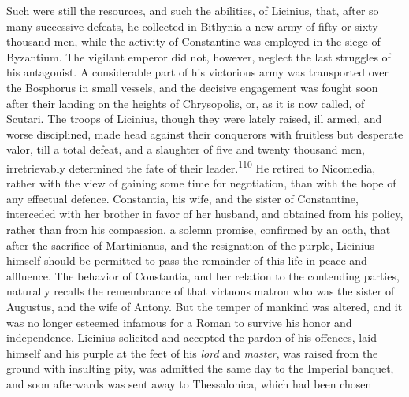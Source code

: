 

Such were still the resources, and such the abilities, of
Licinius, that, after so many successive defeats, he collected in
Bithynia a new army of fifty or sixty thousand men, while the
activity of Constantine was employed in the siege of Byzantium.
The vigilant emperor did not, however, neglect the last struggles
of his antagonist. A considerable part of his victorious army was
transported over the Bosphorus in small vessels, and the decisive
engagement was fought soon after their landing on the heights of
Chrysopolis, or, as it is now called, of Scutari. The troops of
Licinius, though they were lately raised, ill armed, and worse
disciplined, made head against their conquerors with fruitless
but desperate valor, till a total defeat, and a slaughter of five
and twenty thousand men, irretrievably determined the fate of
their leader.\textsuperscript{110} He retired to Nicomedia, rather with the view
of gaining some time for negotiation, than with the hope of any
effectual defence. Constantia, his wife, and the sister of
Constantine, interceded with her brother in favor of her husband,
and obtained from his policy, rather than from his compassion, a
solemn promise, confirmed by an oath, that after the sacrifice of
Martinianus, and the resignation of the purple, Licinius himself
should be permitted to pass the remainder of this life in peace
and affluence. The behavior of Constantia, and her relation to
the contending parties, naturally recalls the remembrance of that
virtuous matron who was the sister of Augustus, and the wife of
Antony. But the temper of mankind was altered, and it was no
longer esteemed infamous for a Roman to survive his honor and
independence. Licinius solicited and accepted the pardon of his
offences, laid himself and his purple at the feet of his \textit{lord}
and \textit{master}, was raised from the ground with insulting pity, was
admitted the same day to the Imperial banquet, and soon
afterwards was sent away to Thessalonica, which had been chosen
